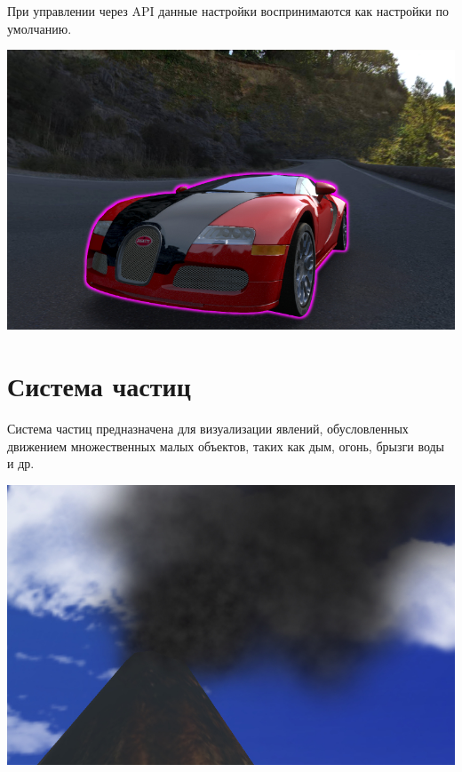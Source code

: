 \documentclass[a4paper,12pt,oneside]{sphinxmanual}
\begin{document}
При управлении через API данные настройки воспринимаются как настройки по умолчанию.

{\hfill\includegraphics[width=1.000\linewidth]{glow.jpg}\hfill}
\label{particles:particles}

\chapter{Система частиц}
\label{particles:index-0}\label{particles::doc}\label{particles:id1}
Система частиц предназначена для визуализации явлений, обусловленных движением множественных малых объектов, таких как дым, огонь, брызги воды и др.

{\hfill\includegraphics[width=1.000\linewidth]{particles_smoke.jpg}\hfill}

\begin{DUlineblock}{0em}
\item[] 
\end{DUlineblock}
\end{document}
